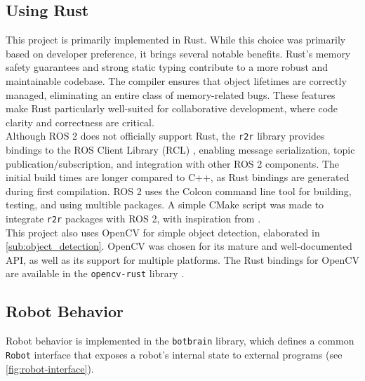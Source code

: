 \subsection{Using Rust}
This project is primarily implemented in Rust. While this choice was primarily based on developer preference, it brings several notable benefits. 
Rust's memory safety guarantees and strong static typing contribute to a more robust and maintainable codebase. The compiler ensures that object lifetimes are correctly managed, eliminating an entire class of memory-related bugs. These features make Rust particularly well-suited for collaborative development, where code clarity and correctness are critical. \\

Although ROS 2 does not officially support Rust, the \texttt{r2r} library \cite{r2r} provides bindings to the ROS Client Library (RCL) \cite{rcl}, enabling message serialization, topic publication/subscription, and integration with other ROS 2 components. The initial build times are longer compared to C++, as Rust bindings are generated during first compilation. ROS 2 uses the Colcon command line tool \cite{colcon} for building, testing, and using multible packages. A simple CMake script was made to integrate \texttt{r2r} packages with ROS 2, with inspiration from \cite{r2r-minimal-node}. \\

This project also uses OpenCV \cite{opencv} for simple object detection, elaborated in \cref{sub:object_detection}. OpenCV was chosen for its mature and well-documented API, as well as its support for multiple platforms. The Rust bindings for OpenCV are available in the \texttt{opencv-rust} library \cite{opencv-rust}.


\subsection{Robot Behavior}
Robot behavior is implemented in the \texttt{botbrain} library, which defines a common \texttt{Robot} interface that exposes a robot’s internal state to external programs (see \cref{fig:robot-interface}).

